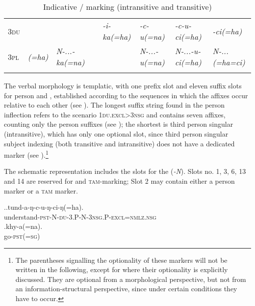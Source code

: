 \begin{sidewaystable}
{{\begin{tabular}{l|l|l|l|l|l|l|l|l}
 \cline{1-2}  \cline{7-9}					
 {\scshape 3du}	 & \multicolumn{2}{r|}{}&   	&  &   \emph{-i-ka(=ha)}& \emph{-c-u(=na)} &\emph{-c-u-ci(=ha)}	&\emph{-ci(=ha)}\\
 \cline{1-1} \cline{4-4} \cline{7-9}	
 {\scshape 3pl}	 	&\multicolumn{2}{r|}{\emph{(=ha)}}&\emph{N-...-ka(=na)}& & &\emph{N-...-u(=na)}&\emph{N-...-u-ci(=ha)}&\emph{N-...(=ha=ci)}\\	
\lspbottomrule
\end{tabular}
}
}
\caption{Indicative / marking (intransitive and transitive)}\label{agr-tab}
\end{sidewaystable} 

The verbal morphology is  templatic, with one prefix slot and eleven suffix slots for person and , established according to the sequences in which the affixes occur relative to each other (see ). The longest suffix string found in the person inflection refers to the scenario {\scshape 1du.excl>3nsg} and contains seven affixes,  counting only the person suffixes (see \Next[a]); the shortest is third person singular (intransitive), which has only one optional slot, since third person singular subject indexing (both transitive and intransitive) does not have a dedicated marker (see \Next[b]).\footnote{The parentheses signalling the optionality of these markers will not be written in the following, except for where their optionality is explicitly discussed. They are optional from a morphological perspective, but not from an information-structural perspective, since under certain conditions they have to occur.}

The schematic representation includes the slots for the  (\emph{-N}). Slots no. 1, 3, 6,  13 and 14 are reserved for  and \textsc{tam}-marking; Slot 2 may contain either a person marker or a \textsc{tam} marker. 

\ex.\ag.tund-a-ŋ-c-u-ŋ-ci-ŋ(=ha).\\
understand{\scshape -pst-N-du-3.P-N-3nsg.P-excl=nmlz.nsg}\\
\bg.khy-a(=na).\\
go{\scshape -pst(=sg)}\\

